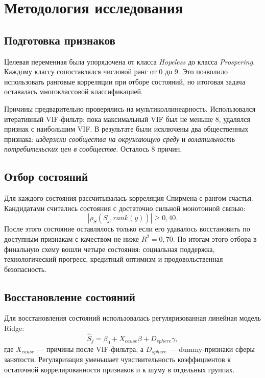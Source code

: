 \section{Методология исследования}

\subsection{Подготовка признаков}

Целевая переменная была упорядочена от класса \textit{Hopeless} до класса
\textit{Prospering}. Каждому классу сопоставлялся числовой ранг от 0 до 9. Это
позволило использовать ранговые корреляции при отборе состояний, но итоговая
задача оставалась многоклассовой классификацией.

Причины предварительно проверялись на мультиколлинеарность. Использовался
итеративный VIF-фильтр: пока максимальный VIF был не меньше 8, удалялся признак
с наибольшим VIF. В результате были исключены два общественных признака:
\textit{издержки сообщества на окружающую среду} и \textit{волатильность
потребительских цен в сообществе}. Осталось 8 причин.

\subsection{Отбор состояний}

Для каждого состояния рассчитывалась корреляция Спирмена с рангом счастья.
Кандидатами считались состояния с достаточно сильной монотонной связью:
\begin{equation}
    |\rho_S(S_j, rank(y))| \ge 0{,}40.
\end{equation}
После этого состояние оставлялось только если его удавалось восстановить по
доступным признакам с качеством не ниже $R^2 = 0{,}70$. По итогам этого отбора в
финальную схему вошли четыре состояния: социальная поддержка, технологический
прогресс, кредитный оптимизм и продовольственная безопасность.

\subsection{Восстановление состояний}

Для восстановления состояний использовалась регуляризованная линейная модель
Ridge:
\begin{equation}
    \hat S_j = \beta_0 + X_{cause}\beta + D_{sphere}\gamma,
\end{equation}
где $X_{cause}$ --- причины после VIF-фильтра, а $D_{sphere}$ --- dummy-признаки
сферы занятости. Регуляризация уменьшает чувствительность коэффициентов к
остаточной коррелированности признаков и к шуму в отдельных группах.

